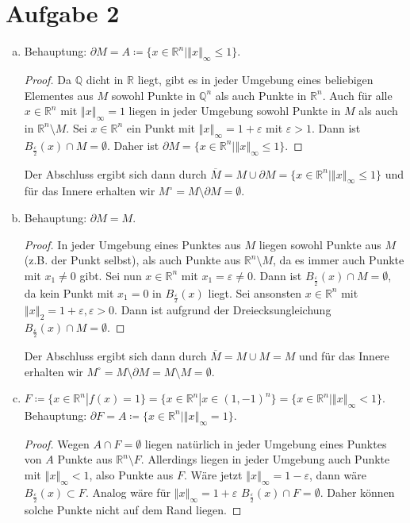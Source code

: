 \documentclass{article}
\theoremstyle{definition}
\newcommand{\Q}{\mathbb{Q}}
\newcommand{\R}{\mathbb{R}}
\newcommand{\norm}[1]{\left\Vert #1 \right\Vert}
\renewcommand{\epsilon}{\varepsilon}
\begin{document}
\section*{Aufgabe 2}
\begin{enumerate}[(a)]
	\item Behauptung: $\partial M = A \coloneqq \{x \in \R^n | \norm{x}_\infty \leq 1\}$.
	\begin{proof}
		
		Da $\Q$ dicht in $\R$ liegt, gibt es in jeder Umgebung eines beliebigen Elementes aus $M$ sowohl Punkte in $\Q^n$ als auch Punkte in $\R^n$. Auch für alle $x\in \R^n$ mit $\norm{x}_\infty = 1$ liegen in jeder Umgebung sowohl Punkte in $M$ als auch in $\R^n\setminus M$. Sei $x\in \R^n$ ein Punkt mit $\norm{x}_\infty = 1 + \epsilon$ mit $\epsilon >1$. Dann ist $B_\frac{\epsilon}{2}(x) \cap M = \emptyset$. Daher ist $\partial M = \{x \in \R^n| \norm{x}_\infty \leq 1\}$. 
	\end{proof}
		Der Abschluss ergibt sich dann durch $\overline{M} = M \cup \partial M = \{x \in \R^n| \norm{x}_\infty \leq 1\}$ und für das Innere erhalten wir $M^\circ = M \setminus \partial M = \emptyset$.
		\item Behauptung: $\partial M = M$.
	\begin{proof}
		In jeder Umgebung eines Punktes aus $M$ liegen sowohl Punkte aus $M$ (z.B. der Punkt selbst), als auch Punkte aus $\R^n \setminus M$, da es immer auch Punkte mit $x_1 \neq 0$ gibt. Sei nun $x \in \R^n$ mit $x_1 = \epsilon \neq 0$. Dann ist $B_\frac{\epsilon}{2}(x) \cap M = \emptyset$, da kein Punkt mit $x_1 = 0$ in  $B_\frac{\epsilon}{2}(x)$ liegt. Sei ansonsten $x \in \R^n$ mit $\norm{x}_2 = 1 + \epsilon, \epsilon > 0$. Dann ist aufgrund der Dreiecksungleichung $B_\frac{\epsilon}{2}(x) \cap M = \emptyset$.
	\end{proof}
	Der Abschluss ergibt sich dann durch $\overline{M} = M \cup M = M$ und für das Innere erhalten wir $M^\circ = M \setminus \partial M = M \setminus M = \emptyset$.
	\item $F \coloneqq \{x\in \R^n| f(x) = 1\} = \{x \in \R^n | x \in (1, -1)^n\} = \{x \in \R^n | \norm{x}_\infty < 1\}$. Behauptung: $\partial F = A \coloneqq \{x \in \R^n | \norm{x}_\infty = 1\}$.
	\begin{proof}
		Wegen $A \cap F = \emptyset$ liegen natürlich in jeder Umgebung eines Punktes von $A$ Punkte aus $\R^n \setminus F$. Allerdings liegen in jeder Umgebung auch Punkte mit $\norm{x}_\infty < 1$, also Punkte aus $F$. Wäre jetzt $\norm{x}_\infty = 1 - \epsilon$, dann wäre $B_\frac{\epsilon}{2}(x) \subset F$. Analog wäre für $\norm{x}_\infty = 1 + \epsilon$ $B_\frac{\epsilon}{2}(x) \cap F = \emptyset$. Daher können solche Punkte nicht auf dem Rand liegen.

\end{proof}
\end{enumerate}
\end{document}
